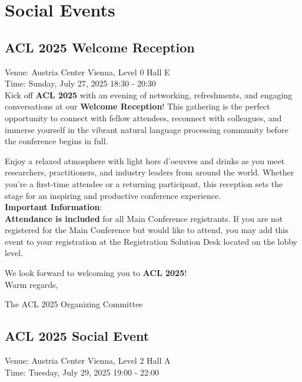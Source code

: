\chapter{Social Events}

\section{ACL 2025 Welcome Reception}
\vspace*{0.2cm}

Venue: Austria Center Vienna, Level 0 Hall E\\
Time: Sunday, July 27, 2025 18:30 - 20:30\\

Kick off \textbf{ACL 2025} with an evening of networking, refreshments, and engaging conversations at our \textbf{Welcome Reception}! This gathering is the perfect opportunity to connect with fellow attendees, reconnect with colleagues, and immerse yourself in the vibrant natural language processing community before the conference begins in full.

Enjoy a relaxed atmosphere with light hors d’oeuvres and drinks as you meet researchers, practitioners, and industry leaders from around the world. Whether you're a first-time attendee or a returning participant, this reception sets the stage for an inspiring and productive conference experience.\\

\textbf{Important Information}:\\
\textbf{Attendance is included} for all Main Conference registrants.
If you are not registered for the Main Conference but would like to attend, you may add this event to your registration at the Registration Solution Desk located on the lobby level.

We look forward to welcoming you to \textbf{ACL 2025}!\\

Warm regards,

The ACL 2025 Organizing Committee

\clearpage

\section{ACL 2025 Social Event}
\vspace*{0.2cm}

Venue: Austria Center Vienna, Level 2 Hall A\\
Time: Tuesday, July 29, 2025 19:00 - 22:00\\

